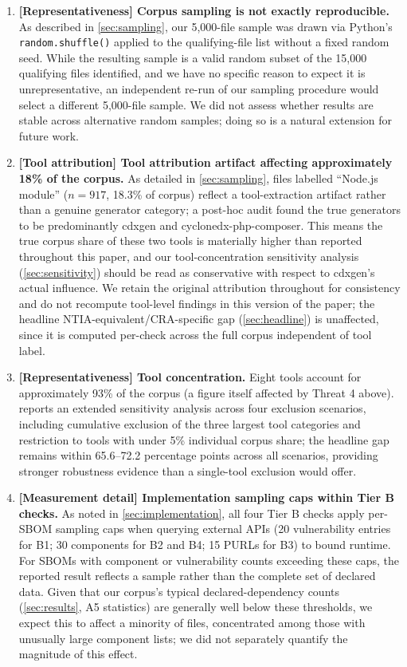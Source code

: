 \documentclass[11pt]{article}
\begin{document}
\begin{enumerate}[label=\arabic*.,leftmargin=*]
\item \textbf{[Representativeness] Corpus sampling is not exactly reproducible.} As described in \cref{sec:sampling}, our 5,000-file sample was drawn via Python's \texttt{random.shuffle()} applied to the qualifying-file list without a fixed random seed. While the resulting sample is a valid random subset of the 15,000 qualifying files identified, and we have no specific reason to expect it is unrepresentative, an independent re-run of our sampling procedure would select a different 5,000-file sample. We did not assess whether results are stable across alternative random samples; doing so is a natural extension for future work.

\item \textbf{[Tool attribution] Tool attribution artifact affecting approximately 18\% of the corpus.} As detailed in \cref{sec:sampling}, files labelled ``Node.js module'' ($n=917$, 18.3\% of corpus) reflect a tool-extraction artifact rather than a genuine generator category; a post-hoc audit found the true generators to be predominantly cdxgen and cyclonedx-php-composer. This means the true corpus share of these two tools is materially higher than reported throughout this paper, and our tool-concentration sensitivity analysis (\cref{sec:sensitivity}) should be read as conservative with respect to cdxgen's actual influence. We retain the original attribution throughout for consistency and do not recompute tool-level findings in this version of the paper; the headline NTIA-equivalent/CRA-specific gap (\cref{sec:headline}) is unaffected, since it is computed per-check across the full corpus independent of tool label.

\item \textbf{[Representativeness] Tool concentration.} Eight tools account for approximately 93\% of the corpus (a figure itself affected by Threat 4 above).  reports an extended sensitivity analysis across four exclusion scenarios, including cumulative exclusion of the three largest tool categories and restriction to tools with under 5\% individual corpus share; the headline gap remains within 65.6--72.2 percentage points across all scenarios, providing stronger robustness evidence than a single-tool exclusion would offer.

\item \textbf{[Measurement detail] Implementation sampling caps within Tier B checks.} As noted in \cref{sec:implementation}, all four Tier B checks apply per-SBOM sampling caps when querying external APIs (20 vulnerability entries for B1; 30 components for B2 and B4; 15 PURLs for B3) to bound runtime. For SBOMs with component or vulnerability counts exceeding these caps, the reported result reflects a sample rather than the complete set of declared data. Given that our corpus's typical declared-dependency counts (\cref{sec:results}, A5 statistics) are generally well below these thresholds, we expect this to affect a minority of files, concentrated among those with unusually large component lists; we did not separately quantify the magnitude of this effect.


\end{enumerate}
\end{document}
